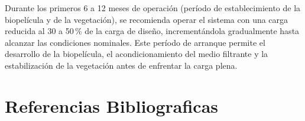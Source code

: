 \documentclass[12pt,a4paper]{article}
\begin{document}
Durante los primeros 6 a 12 meses de operación (período de establecimiento de la biopelícula y de la vegetación), se recomienda operar el sistema con una carga reducida al 30 a 50\,\% de la carga de diseño, incrementándola gradualmente hasta alcanzar las condiciones nominales. Este período de arranque permite el desarrollo de la biopelícula, el acondicionamiento del medio filtrante y la estabilización de la vegetación antes de enfrentar la carga plena.



\newpage
\section{Referencias Bibliograficas}


\end{document}
